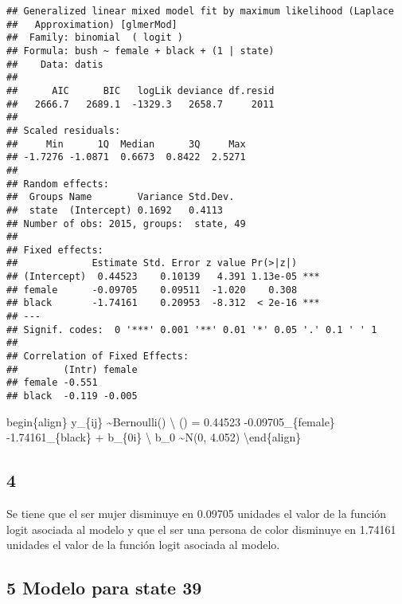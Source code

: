 \documentclass[
]{article}
\newenvironment{Shaded}{\begin{snugshade}}{\end{snugshade}}
\newcommand{\DecValTok}[1]{\textcolor[rgb]{0.00,0.00,0.81}{#1}}
\newcommand{\FunctionTok}[1]{\textcolor[rgb]{0.00,0.00,0.00}{#1}}
\newcommand{\NormalTok}[1]{#1}
\newcommand{\OtherTok}[1]{\textcolor[rgb]{0.56,0.35,0.01}{#1}}
\newcommand{\SpecialCharTok}[1]{\textcolor[rgb]{0.00,0.00,0.00}{#1}}
\begin{document}
\begin{verbatim}
## Generalized linear mixed model fit by maximum likelihood (Laplace
##   Approximation) [glmerMod]
##  Family: binomial  ( logit )
## Formula: bush ~ female + black + (1 | state)
##    Data: datis
## 
##      AIC      BIC   logLik deviance df.resid 
##   2666.7   2689.1  -1329.3   2658.7     2011 
## 
## Scaled residuals: 
##     Min      1Q  Median      3Q     Max 
## -1.7276 -1.0871  0.6673  0.8422  2.5271 
## 
## Random effects:
##  Groups Name        Variance Std.Dev.
##  state  (Intercept) 0.1692   0.4113  
## Number of obs: 2015, groups:  state, 49
## 
## Fixed effects:
##             Estimate Std. Error z value Pr(>|z|)    
## (Intercept)  0.44523    0.10139   4.391 1.13e-05 ***
## female      -0.09705    0.09511  -1.020    0.308    
## black       -1.74161    0.20953  -8.312  < 2e-16 ***
## ---
## Signif. codes:  0 '***' 0.001 '**' 0.01 '*' 0.05 '.' 0.1 ' ' 1
## 
## Correlation of Fixed Effects:
##        (Intr) female
## female -0.551       
## black  -0.119 -0.005
\end{verbatim}

begin\{align\} y\_\{ij\} \sim  Bernoulli() \textbackslash{}
() = 0.44523 -0.09705\_\{female\}
-1.74161\_\{black\} + b\_\{0i\} \textbackslash{} b\_0 \sim N(0, 4.052)
\textbackslash end\{align\}

\hypertarget{section-3}{%
\subsection{4}\label{section-3}}

Se tiene que el ser mujer disminuye en 0.09705 unidades el valor de la
función logit asociada al modelo y que el ser una persona de color
disminuye en 1.74161 unidades el valor de la función logit asociada al
modelo.

\hypertarget{modelo-para-state-39}{%
\subsection{5 Modelo para state 39}\label{modelo-para-state-39}}

\begin{Shaded}
\end{Shaded}
\end{document}
